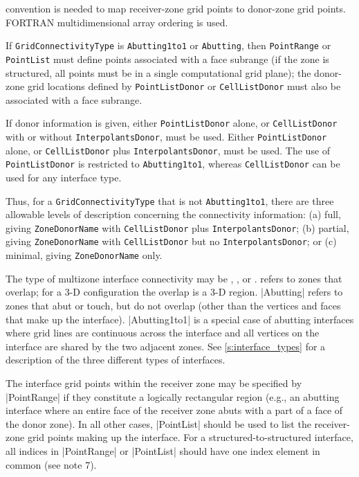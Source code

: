 \begin{notes}
      convention is needed to map receiver-zone grid points to
      donor-zone grid points.
      FORTRAN multidimensional array ordering is used.
\item If \texttt{GridConnectivityType} is \texttt{Abutting1to1} or
      \texttt{Abutting}, then \texttt{PointRange} or \texttt{PointList}
      must define points associated with a face subrange (if
      the zone is structured, all points must be in a single
      computational grid plane); the donor-zone grid locations defined
      by \texttt{PointListDonor} or \texttt{CellListDonor} must also be
      associated with a face subrange.
\item If donor information is given, either \texttt{PointListDonor}
      alone, or \texttt{CellListDonor} with or without
      \texttt{InterpolantsDonor}, must be used.
      Either \texttt{PointListDonor} alone, or \texttt{CellListDonor}
      plus \texttt{InterpolantsDonor}, must be used.
      The use of \texttt{PointListDonor} is restricted to
      \texttt{Abutting1to1}, whereas \texttt{CellListDonor} can be used
      for any interface type.
\item Thus, for a \texttt{GridConnectivityType} that is not
      \texttt{Abutting1to1}, there are three allowable levels of
      description concerning the connectivity information: (a) full,
      giving \texttt{ZoneDonorName} with \texttt{CellListDonor}
      plus \texttt{InterpolantsDonor}; (b) partial, giving
      \texttt{ZoneDonorName} with \texttt{CellListDonor} but
      no \texttt{InterpolantsDonor}; or (c) minimal, giving
      \texttt{ZoneDonorName} only.
\end{notes}

The type of multizone interface connectivity may be ,
, or .
 refers to zones that overlap; for a 3-D configuration the
overlap is a 3-D region.
|Abutting| refers to zones that abut or touch, but do not overlap (other
than the vertices and faces that make up the interface).
|Abutting1to1| is a special case of abutting interfaces where grid lines
are continuous across the interface and all vertices on the interface
are shared by the two adjacent zones.
See \autoref{s:interface_types} for a description of the three different
types of interfaces.

The interface grid points within the receiver zone may be specified by
|PointRange| if they constitute a logically rectangular region (e.g., an
abutting interface where an entire face of the receiver zone abuts with a
part of a face of the donor zone).  In all other cases, |PointList| should be
used to list the receiver-zone grid points making up the interface.
For a structured-to-structured interface, all indices in |PointRange| or
|PointList| should have one index element in common (see note 7).

